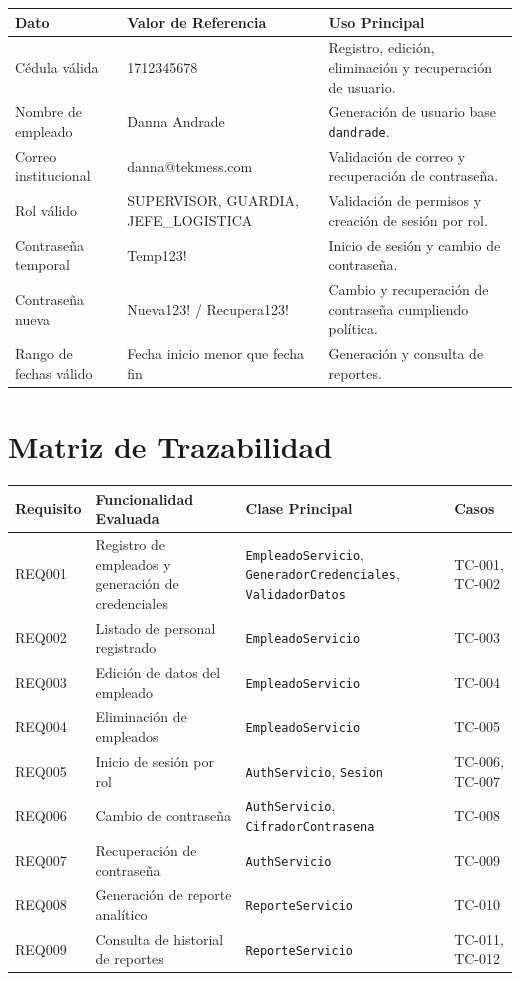 \documentclass[12pt,a4paper]{article}
\begin{document}
\begin{longtable}{|p{3.5cm}|p{4.5cm}|p{6cm}|}
\hline
\rowcolor{grisClaro}
\textbf{Dato} & \textbf{Valor de Referencia} & \textbf{Uso Principal} \\
\hline
Cédula válida & 1712345678 & Registro, edición, eliminación y recuperación de usuario. \\
\hline
Nombre de empleado & Danna Andrade & Generación de usuario base \texttt{dandrade}. \\
\hline
Correo institucional & danna@tekmess.com & Validación de correo y recuperación de contraseña. \\
\hline
Rol válido & SUPERVISOR, GUARDIA, JEFE\_LOGISTICA & Validación de permisos y creación de sesión por rol. \\
\hline
Contraseña temporal & Temp123! & Inicio de sesión y cambio de contraseña. \\
\hline
Contraseña nueva & Nueva123! / Recupera123! & Cambio y recuperación de contraseña cumpliendo política. \\
\hline
Rango de fechas válido & Fecha inicio menor que fecha fin & Generación y consulta de reportes. \\
\hline
\end{longtable}

\section{Matriz de Trazabilidad}

\begin{longtable}{|p{2cm}|p{5cm}|p{4cm}|p{3cm}|}
\hline
\rowcolor{grisClaro}
\textbf{Requisito} & \textbf{Funcionalidad Evaluada} & \textbf{Clase Principal} & \textbf{Casos} \\
\hline
REQ001 & Registro de empleados y generación de credenciales & \texttt{EmpleadoServicio}, \texttt{GeneradorCredenciales}, \texttt{ValidadorDatos} & TC-001, TC-002 \\
\hline
REQ002 & Listado de personal registrado & \texttt{EmpleadoServicio} & TC-003 \\
\hline
REQ003 & Edición de datos del empleado & \texttt{EmpleadoServicio} & TC-004 \\
\hline
REQ004 & Eliminación de empleados & \texttt{EmpleadoServicio} & TC-005 \\
\hline
REQ005 & Inicio de sesión por rol & \texttt{AuthServicio}, \texttt{Sesion} & TC-006, TC-007 \\
\hline
REQ006 & Cambio de contraseña & \texttt{AuthServicio}, \texttt{CifradorContrasena} & TC-008 \\
\hline
REQ007 & Recuperación de contraseña & \texttt{AuthServicio} & TC-009 \\
\hline
REQ008 & Generación de reporte analítico & \texttt{ReporteServicio} & TC-010 \\
\hline
REQ009 & Consulta de historial de reportes & \texttt{ReporteServicio} & TC-011, TC-012 \\
\hline
\end{longtable}
\end{document}
